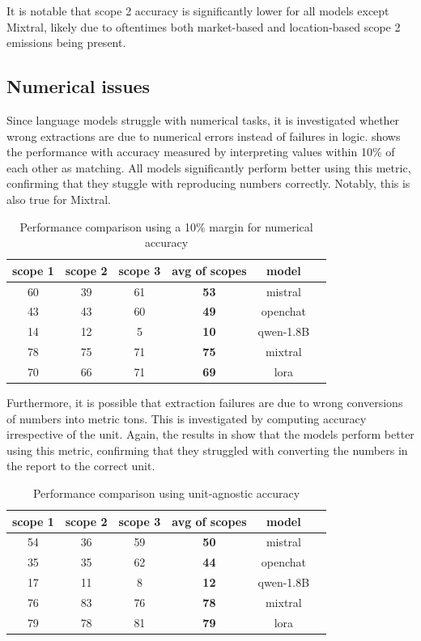 \documentclass[]{article}
\begin{document}
	It is notable that scope 2 accuracy is significantly lower for all models except Mixtral, likely due to oftentimes both market-based and location-based scope 2 emissions being present.
	
	\subsection{Numerical issues}
	
	Since language models struggle with numerical tasks, it is investigated whether wrong extractions are due to numerical errors instead of failures in logic.  shows the performance with accuracy measured by interpreting values within 10\% of each other as matching. All models significantly perform better using this metric, confirming that they stuggle with reproducing numbers correctly. Notably, this is also true for Mixtral.
	
	\begin{table}[h!]
		\centering
		\begin{tabular}{@{}cccccc@{}}
			\toprule
			scope 1 & scope 2 & scope 3 & avg of scopes & model \\ \midrule
			60 & 39 & 61 & \textbf{53} & mistral \\
			43 & 43 & 60 & \textbf{49} & openchat \\
			14 & 12 & 5 & \textbf{10} & qwen-1.8B \\
			78 & 75 & 71 & \textbf{75} & mixtral \\
			70 & 66 & 71 & \textbf{69} & lora \\ \bottomrule
		\end{tabular}
		\caption{Performance comparison using a 10\% margin for numerical accuracy}
		\label{tab:numerical_accuracy}
	\end{table}
	
	Furthermore, it is possible that extraction failures are due to wrong conversions of numbers into metric tons. This is investigated by computing accuracy irrespective of the unit. Again, the results in  show that the models perform better using this metric, confirming that they struggled with converting the numbers in the report to the correct unit.
	
	\begin{table}[h!]
		\centering
		\begin{tabular}{@{}cccccc@{}}
			\toprule
			scope 1 & scope 2 & scope 3 & avg of scopes & model \\ \midrule
			54 & 36 & 59 & \textbf{50} & mistral \\
			35 & 35 & 62 & \textbf{44} & openchat \\
			17 & 11 & 8 & \textbf{12} & qwen-1.8B \\
			76 & 83 & 76 & \textbf{78} & mixtral \\
			79 & 78 & 81 & \textbf{79} & lora \\ \bottomrule
		\end{tabular}
		\caption{Performance comparison using unit-agnostic accuracy}
		\label{tab:unit_agnostic_accuracy}
	\end{table}
	
\end{document}
